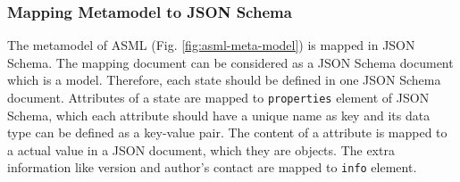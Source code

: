 \subsubsection{Mapping Metamodel to JSON Schema}
The metamodel of ASML (Fig. \ref{fig:asml-meta-model}) is mapped in JSON Schema. The mapping document can be considered as a JSON Schema document which is a model. Therefore, each state should be defined in one JSON Schema document. Attributes of a state are mapped to \lstinline[basicstyle=\ttfamily]{properties} element of JSON Schema, which each attribute should have a unique name as key and its data type can be defined as a key-value pair. The content of a attribute is mapped to a actual value in a JSON document, which they are objects. The extra information like version and author's contact are mapped to \lstinline[basicstyle=\ttfamily]{info} element.


